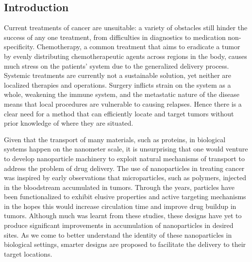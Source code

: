 \subsection{Introduction}
Current treatments of cancer are unsuitable: a variety of obstacles still hinder the success of any one treatment, from difficulties in diagnostics to medication non-specificity.
Chemotherapy, a common treatment that aims to eradicate a tumor by evenly distributing chemotherapeutic agents across regions in the body, causes much stress on the patients' system\cite{Extermann2012,Johnstone2002} due to the generalized delivery process.
Systemic treatments are currently not a sustainable solution\cite{Curigliano2010}, yet neither are localized therapies and operations.
Surgery inflicts strain on the system as a whole, weakening the immune system, and the metastatic nature of the disease means that local procedures are vulnerable to causing relapses\cite{VanDalum2015}.
Hence there is a clear need for a method that can efficiently locate and target tumors without prior knowledge of where they are situated.

Given that the transport of many materials, such as proteins, in biological systems happen on the nanometer scale, it is unsurprising that one would venture to develop nanoparticle machinery to exploit natural mechanisms of transport to address the problem of drug delivery.
The use of nanoparticles in treating cancer was inspired by early observations that microparticles, such as polymers, injected in the bloodstream accumulated in tumors\cite{Matsumura1986}.
Through the years, particles have been functionalized to exhibit elusive properties and active targeting mechanisms in the hopes this would increase circulation time and improve drug buildup in tumors.
Although much was learnt from these studies, these designs have yet to produce significant improvements in accumulation of nanoparticles in desired sites\cite{Kirpotin2006}.
As we come to better understand the identity of these nanoparticles in biological settings, smarter designs are proposed to facilitate the delivery to their target locations.

